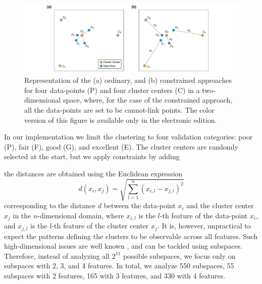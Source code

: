 \begin{figure}[t]
	\centering
	\includegraphics[width=\textwidth]{figures/pdf/figure-04}
	\caption{Representation of the (a) ordinary, and (b) constrained \kmeans{} approaches for four data-points (P) and four cluster centers (C) in a two-dimensional space, where, for the case of the constrained \kmeans{} approach, all the data-points are set to be cannot-link points. The color version of this figure is available only in the electronic edition.}
	\label{fig:k-means}
\end{figure}

In our implementation we limit the clustering to four validation categories: poor (P), fair (F), good (G), and excellent (E). The cluster centers are randomly selected at the start, but we apply constraints by adding 

 the distances are obtained using the Euclidean expression
%
\begin{equation}
	d(x_i, x_j) = \sqrt{ \sum_{l=1}^{n} \left( x_{i,l} - x_{j,l} \right)^2 }
\end{equation}
%
corresponding to the distance $d$ between the data-point $x_i$ and the cluster center $x_j$ in the $n$-dimensional domain, where $x_{i,l}$ is the $l$-th feature of the data-point $x_i$, and $x_{j,l}$ is the $l$-th feature of the cluster center $x_j$. It is, however, unpractical to expect the patterns defining the clusters to be observable across all features. Such high-dimensional issues are well known \citep[see, for instance,][]{Parsons_2004_ACM, Dy_2004_MLR}, and can be tackled using subspaces. Therefore, instead of analyzing all $2^{11}$ possible subspaces, we focus only on subspaces with 2, 3, and 4 features. In total, we analyze 550 subspaces, 55 subspaces with 2 features, 165 with 3 features, and 330 with 4 features.

